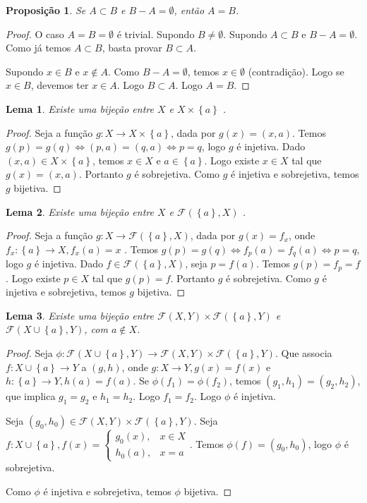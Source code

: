 \documentclass{article}
\theoremstyle{plain}
\newtheorem{prop}{Proposição}[section]
\newtheorem{lema}{Lema}
\theoremstyle{definition}
\theoremstyle{remark}
\begin{document}
\begin{prop}
	Se $A\subset B$ e $B-A = \emptyset$, então $A = B$.
\end{prop}
\begin{proof}
	O caso $A = B  = \emptyset $ é trivial. Supondo $B \neq \emptyset$.
	Supondo $A\subset B$ e $B-A = \emptyset$. Como já temos $A\subset B$, basta provar $B \subset A$. 

	Supondo $x\in B$ e $x\not \in A$. Como $B-A = \emptyset$, temos $x\in \emptyset$ (contradição). Logo se $x\in B$, devemos ter $x\in A$. Logo $B \subset A$. Logo $A = B$.
\end{proof}
\begin{lema}
	Existe uma bijeção entre $X$ e  $X \times \left\{ a\right\}$ .
\end{lema}
\begin{proof}
	Seja a função $g: X  \to  X \times \left\{a\right\}$, dada por $g(x) = (x,a)$. Temos $g(p) = g(q) \iff (p,a) = (q,a) \iff p = q $, logo $g$ é injetiva. Dado $(x,a) \in X \times \left\{ a\right\}$, temos $x\in X$ e $a\in \left\{a\right\}$. Logo existe $x\in X$ tal que $g(x) = (x,a) $. Portanto $g$ é sobrejetiva. Como $g$ é injetiva e sobrejetiva, temos  $g$  bijetiva.
\end{proof}
\begin{lema}
	Existe uma bijeção entre $X$ e  $\mathcal{F}(\left\{a\right\}, X )$ .
\end{lema}
\begin{proof}
	Seja a função $g: X  \to  \mathcal{F}( \left\{a\right\}, X )$, dada por $g(x) = f_x$, onde $f_x: \left\{ a\right\} \to X, f_x(a) = x$ . Temos $g(p) = g(q) \iff f_p(a) = f_q(a) \iff p = q $, logo $g$ é injetiva. Dado $f \in \mathcal{F}( \left\{ a\right\}, X)$, seja $p = f(a)$. Temos $g(p) = f_p = f$. Logo existe $p\in X$ tal que $g(p) = f $. Portanto $g$ é sobrejetiva. Como $g$ é injetiva e sobrejetiva, temos  $g$  bijetiva.
\end{proof}
\begin{lema}
	Existe uma bijeção entre $\mathcal{F}(X  , Y )\times \mathcal{F}( \left\{ a \right\} , Y ) $ e  $\mathcal{F}(X \cup \left\{ a \right\} , Y )$, com $a\not \in X$.
\end{lema}
\begin{proof}
	Seja $\phi: \mathcal{F}(X \cup \left\{ a \right\} , Y ) \to \mathcal{F}(X  , Y )\times \mathcal{F}( \left\{ a \right\} , Y ) $. Que associa $f: X\cup \left\{a\right\} \to Y$ a $(g,h)$, onde $g: X\to Y, g(x) = f(x)$ e $h: \left\{a\right\} \to Y, h(a) = f(a)$. Se $\phi(f_1) = \phi(f_2)$, temos $(g_1, h_1) = (g_2, h_2)$, que implica $g_1 = g_2$ e $h_1 = h_2$. Logo $f_1 = f_2$. Logo $\phi$ é injetiva. 

	Seja $(g_0,h_0) \in \mathcal{F}(X  , Y )\times \mathcal{F}( \left\{ a \right\} , Y ) $. Seja $f: X\cup \left\{a\right\}, f(x) = \begin{cases} g_0(x), & x\in X \\ h_0(a), &x= a \end{cases}$. Temos $\phi(f)  = (g_0,h_0)$, logo $\phi$ é sobrejetiva.

		Como $\phi$ é injetiva e sobrejetiva, temos $\phi$ bijetiva.
\end{proof}
\end{document}
